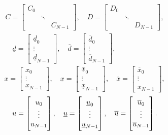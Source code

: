 \documentclass[a4paper]{article}
\newcommand{\bbmat}{\begin{bmatrix}}
\newcommand{\ebmat}{\end{bmatrix}}
\begin{document}
\begin{multline}
	C = \bbmat C_0 \\ & \ddots \\ && C_{N-1} \ebmat,
	\quad D = \bbmat D_0 \\ & \ddots \\ && D_{N-1} \ebmat,\\
	\quad \underline{d} = \bbmat \underline{d}_0 \\ \vdots \\ \underline{d}_{N-1} \ebmat,
	\quad \overline{d} = \bbmat \overline{d}_0 \\ \vdots \\ \overline{d}_{N-1} \ebmat,
\end{multline}
\begin{equation}
	x = \bbmat x_0 \\ \vdots \\ x_{N-1} \ebmat,
	\quad \underline{x} = \bbmat \underline{x}_0 \\ \vdots \\ \underline{x}_{N-1} \ebmat,
	\quad \overline{x} = \bbmat \overline{x}_0 \\ \vdots \\ \overline{x}_{N-1} \ebmat,
\end{equation}
\begin{equation}
	u = \bbmat u_0 \\ \vdots \\ u_{N-1} \ebmat,\\	
	\quad \underline{u} = \bbmat \underline{u}_0 \\ \vdots \\ \underline{u}_{N-1} \ebmat,
	\quad \overline{u} = \bbmat \overline{u}_0 \\ \vdots \\ \overline{u}_{N-1} \ebmat.
\end{equation}
\end{document}
